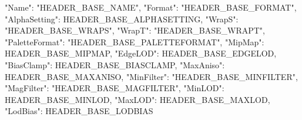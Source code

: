 {
    "Name":			 "HEADER_BASE_NAME",
    "Format": 		 "HEADER_BASE_FORMAT",
    "AlphaSetting":   HEADER_BASE_ALPHASETTING,
    "WrapS": 		 "HEADER_BASE_WRAPS",
    "WrapT": 		 "HEADER_BASE_WRAPT",
    "PaletteFormat": "HEADER_BASE_PALETTEFORMAT",
    "MipMap": 		  HEADER_BASE_MIPMAP,
    "EdgeLOD": 		  HEADER_BASE_EDGELOD,
    "BiasClamp": 	  HEADER_BASE_BIASCLAMP,
    "MaxAniso": 	  HEADER_BASE_MAXANISO,
    "MinFilter": 	  "HEADER_BASE_MINFILTER",
    "MagFilter": 	  "HEADER_BASE_MAGFILTER",
    "MinLOD": 		  HEADER_BASE_MINLOD,
    "MaxLOD": 		  HEADER_BASE_MAXLOD,
    "LodBias": 		  HEADER_BASE_LODBIAS
}